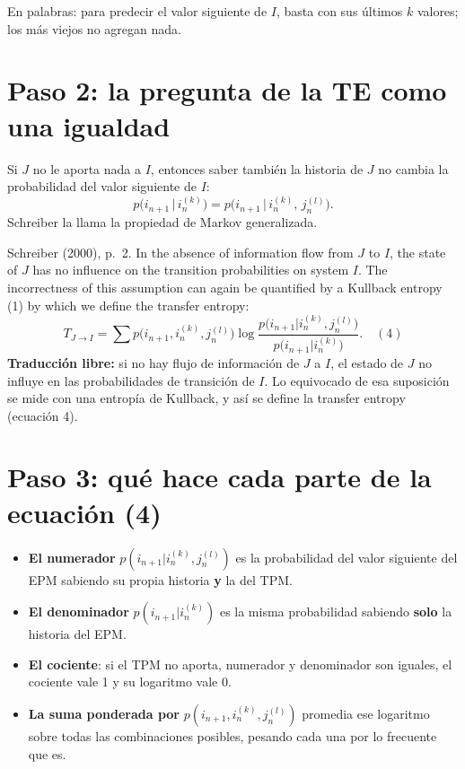 \documentclass[11pt,openany]{book}
\begin{document}
En palabras: para predecir el valor siguiente de $I$, basta con sus últimos $k$ valores; los más viejos no agregan nada.

\section{Paso 2: la pregunta de la TE como una igualdad}

Si $J$ no le aporta nada a $I$, entonces saber también la historia de $J$ no cambia la probabilidad del valor siguiente de $I$:
\[ p\big(i_{n+1}\,\big|\,i_n^{(k)}\big) = p\big(i_{n+1}\,\big|\,i_n^{(k)},\, j_n^{(l)}\big). \]
Schreiber la llama la propiedad de Markov generalizada.

\begin{cita}{Schreiber (2000), p.~2.}
In the absence of information flow from $J$ to $I$, the state of $J$ has no influence on the transition probabilities on system $I$. The incorrectness of this assumption can again be quantified by a Kullback entropy (1) by which we define the transfer entropy:
\[ T_{J\to I} = \sum p\big(i_{n+1}, i_n^{(k)}, j_n^{(l)}\big)\log\frac{p\big(i_{n+1}|i_n^{(k)}, j_n^{(l)}\big)}{p\big(i_{n+1}|i_n^{(k)}\big)}. \quad (4) \]
\tcblower
\textbf{Traducción libre:} si no hay flujo de información de $J$ a $I$, el estado de $J$ no influye en las probabilidades de transición de $I$. Lo equivocado de esa suposición se mide con una entropía de Kullback, y así se define la transfer entropy (ecuación 4).
\end{cita}

\section{Paso 3: qué hace cada parte de la ecuación (4)}

\begin{itemize}
\item \textbf{El numerador} $p(i_{n+1}|i_n^{(k)}, j_n^{(l)})$ es la probabilidad del valor siguiente del EPM sabiendo su propia historia \textbf{y} la del TPM.
\item \textbf{El denominador} $p(i_{n+1}|i_n^{(k)})$ es la misma probabilidad sabiendo \textbf{solo} la historia del EPM.
\item \textbf{El cociente}: si el TPM no aporta, numerador y denominador son iguales, el cociente vale 1 y su logaritmo vale 0.
\item \textbf{La suma ponderada por} $p(i_{n+1}, i_n^{(k)}, j_n^{(l)})$ promedia ese logaritmo sobre todas las combinaciones posibles, pesando cada una por lo frecuente que es.
\end{itemize}
\end{document}
